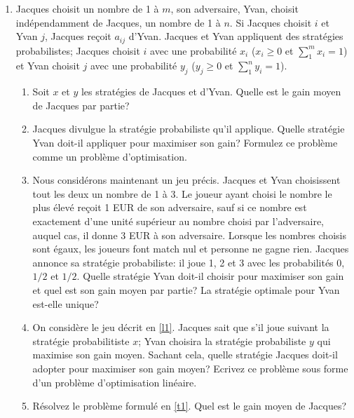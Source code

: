 \begin{enumerate}
  \item  Jacques choisit un nombre de 1 à $m$, son adversaire, Yvan, choisit indépendamment
    de Jacques, un nombre de 1 à $n$. Si Jacques choisit $i$ et Yvan $j$, Jacques reçoit
    $a_{ij}$ d'Yvan. Jacques et Yvan appliquent des stratégies probabilistes; Jacques
    choisit
    $i$ avec une probabilité
    $x_i$  ($x_i \geq 0$ et $\sum_1^m x_i =1$) et Yvan choisit $j$ avec une probabilité
    $y_j$ ($y_j \geq 0$ et $\sum_1^n y_i =1$).

    \begin{enumerate}
      \item Soit $x$ et $y$ les stratégies de Jacques et d'Yvan. Quelle est le gain moyen de
        Jacques par partie?
      \item Jacques divulgue la stratégie probabiliste qu'il applique. Quelle stratégie Yvan
        doit-il appliquer pour maximiser son gain? Formulez ce problème comme un problème
        d'optimisation.
      \item \label{l1} Nous considérons maintenant un jeu précis. Jacques et Yvan choisissent tout les deux un nombre
        de  1 à 3. Le joueur ayant choisi le nombre le plus élevé reçoit 1 EUR de son adversaire, sauf si ce
        nombre est exactement d'une unité supérieur au nombre choisi par l'adversaire, auquel cas,
        il donne 3 EUR à son adversaire. Lorsque les nombres choisis sont égaux, les joueurs font
        match nul et personne ne gagne rien. Jacques annonce sa stratégie probabiliste: il joue 1,
        2 et 3 avec les probabilités $0$,
        $1/2$ et $1/2$. Quelle stratégie Yvan doit-il choisir pour maximiser son gain et quel est
        son gain moyen par partie? La stratégie optimale pour Yvan est-elle unique?
      \item \label{t1} On considère le jeu décrit en \ref{l1}. Jacques sait que s'il joue suivant la stratégie
        probabilitiste
        $x$; Yvan choisira la stratégie probabiliste $y$ qui maximise son gain moyen. Sachant cela, quelle stratégie
        Jacques doit-il adopter pour maximiser son gain moyen? Ecrivez ce
        problème sous forme d'un problème d'optimisation linéaire.

      \item Résolvez le problème formulé en \ref{t1}. Quel est le gain moyen de Jacques?

    \end{enumerate}



    \begin{solution}
    \end{solution}


\end{enumerate}
